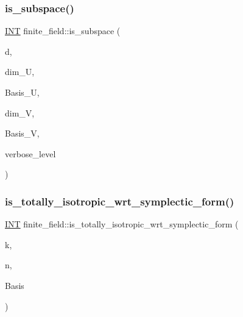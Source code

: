 \mbox{\label{classfinite__field_a7cc3be6742b97e3af2a33007ac62bc5f}} 
\subsubsection{\texorpdfstring{is\+\_\+subspace()}{is\_subspace()}}
{\footnotesize\ttfamily \mbox{\hyperlink{galois_8h_a09fddde158a3a20bd2dcadb609de11dc}{I\+NT}} finite\+\_\+field\+::is\+\_\+subspace (\begin{DoxyParamCaption}\item[{\mbox{\hyperlink{galois_8h_a09fddde158a3a20bd2dcadb609de11dc}{I\+NT}}}]{d,  }\item[{\mbox{\hyperlink{galois_8h_a09fddde158a3a20bd2dcadb609de11dc}{I\+NT}}}]{dim\+\_\+U,  }\item[{\mbox{\hyperlink{galois_8h_a09fddde158a3a20bd2dcadb609de11dc}{I\+NT}} $\ast$}]{Basis\+\_\+U,  }\item[{\mbox{\hyperlink{galois_8h_a09fddde158a3a20bd2dcadb609de11dc}{I\+NT}}}]{dim\+\_\+V,  }\item[{\mbox{\hyperlink{galois_8h_a09fddde158a3a20bd2dcadb609de11dc}{I\+NT}} $\ast$}]{Basis\+\_\+V,  }\item[{\mbox{\hyperlink{galois_8h_a09fddde158a3a20bd2dcadb609de11dc}{I\+NT}}}]{verbose\+\_\+level }\end{DoxyParamCaption})}

\mbox{\label{classfinite__field_ab244654b491c21f56b9b83a8be559dc3}} 
\subsubsection{\texorpdfstring{is\+\_\+totally\+\_\+isotropic\+\_\+wrt\+\_\+symplectic\+\_\+form()}{is\_totally\_isotropic\_wrt\_symplectic\_form()}}
{\footnotesize\ttfamily \mbox{\hyperlink{galois_8h_a09fddde158a3a20bd2dcadb609de11dc}{I\+NT}} finite\+\_\+field\+::is\+\_\+totally\+\_\+isotropic\+\_\+wrt\+\_\+symplectic\+\_\+form (\begin{DoxyParamCaption}\item[{\mbox{\hyperlink{galois_8h_a09fddde158a3a20bd2dcadb609de11dc}{I\+NT}}}]{k,  }\item[{\mbox{\hyperlink{galois_8h_a09fddde158a3a20bd2dcadb609de11dc}{I\+NT}}}]{n,  }\item[{\mbox{\hyperlink{galois_8h_a09fddde158a3a20bd2dcadb609de11dc}{I\+NT}} $\ast$}]{Basis }\end{DoxyParamCaption})}

